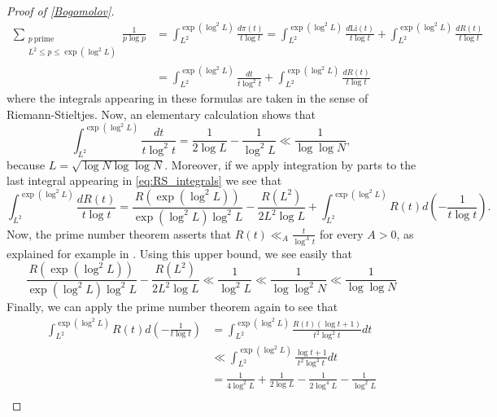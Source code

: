 \documentclass[10pt,a4paper]{amsart}
\theoremstyle{plain}
\theoremstyle{definition}
\theoremstyle{remark}
\begin{document}
\begin{proof}[Proof of \cref{Bogomolov}]
\begin{equation} \label{eq:RS_integrals}
    \begin{aligned}
    \sum_{\substack{p \ \text{prime} \\ L^2 \leq p \leq \exp(\log^2L)}} \frac{1}{p \log p} &= \int_{L^2}^{\exp(\log^2L)} \frac{d\pi(t)}{t \log t} = \int_{L^2}^{\exp(\log^2L)} \frac{d\mathrm{Li}(t)}{t \log t} + \int_{L^2}^{\exp(\log^2 L )} \frac{dR(t)}{t \log t} \\
    &= \int_{L^2}^{\exp(\log^2 L)} \frac{dt}{t \log^2 t} + \int_{L^2}^{\exp(\log^2L)} \frac{dR(t)}{t \log t}
    \end{aligned}
\end{equation}
where the integrals appearing in these formulas are taken in the sense of Riemann-Stieltjes. Now, an elementary calculation shows that
\begin{equation} \label{eq:PNT1_main}
    \int_{L^2}^{\exp(\log^2L)} \frac{dt}{t \log^2t} = \frac{1}{2 \log L} - \frac{1}{\log^2L} \ll \frac{1}{\log\log N},
\end{equation}
because $L = \sqrt{\log N \log\log N}$.
Moreover, if we apply integration by parts to the last integral appearing in \eqref{eq:RS_integrals} we see that
\begin{equation} \label{eq:RS_integrals_parts}
\int_{L^2}^{\exp(\log^2L)} \frac{dR(t)}{t \log t} = \frac{R(\exp(\log^2L))}{\exp(\log^2L) \log^2L} - \frac{R(L^2)}{2 L^2 \log L} + \int_{L^2}^{\exp(\log^2L)} R(t) d\left( -\frac{1}{t \log t} \right).
\end{equation}
Now, the prime number theorem asserts that $R(t) \ll_A \frac{t}{\log^A t}$ for every $A > 0$, as explained for example in \cite[Section~2.4]{Iwaniec_Kowalski_2004}. Using this upper bound, we see easily that
\begin{equation} \label{eq:PNT1_remainder1}
    \frac{R(\exp(\log^2L))}{\exp(\log^2L) \log^2L} - \frac{R(L^2)}{2 L^2 \log L} \ll \frac{1}{\log^2L} \ll \frac{1}{\log\log^2N} \ll \frac{1}{\log\log N}
\end{equation}
Finally, we can apply the prime number theorem again to see that
\begin{equation} \label{eq:PNT1_remainder2}
    \begin{aligned}
        \int_{L^2}^{\exp(\log^2L)} R(t) d\left( -\frac{1}{t \log t} \right) &= \int_{L^2}^{\exp(\log^2L)} \frac{R(t) (\log t+1)}{t^2 \log^2t} dt \\ &\ll \int_{L^2}^{\exp(\log^2L)} \frac{\log t+1}{t^2 \log^3t} dt \\
        &= \frac{1}{4 \log^2 L} + \frac{1}{2 \log L} - \frac{1}{2 \log^4L} - \frac{1}{\log^2L} \\

\end{aligned}
\end{equation}
\end{proof}
\end{document}
